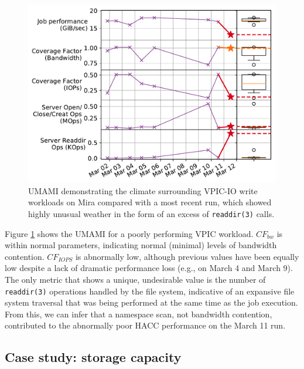 {\begin{figure}[t]
    \centering
    \includegraphics[width=1.0\columnwidth]{figs/umami-mira-fs1-vpic-write.pdf}
    \vspace{-.25in}
    \caption{UMAMI demonstrating the climate surrounding VPIC-IO write workloads on Mira compared with a most recent run, which showed highly unusual weather in the form of an excess of \texttt{readdir(3)} calls.
    }
    \label{fig:umami-mira-fs1-vpic-write}
	\vspace{-.15in}
\end{figure}

Figure \ref{fig:umami-mira-fs1-vpic-write} shows the UMAMI for a poorly performing VPIC workload.
$\mathit{CF}_{\mathit{bw}}$ is within normal parameters, indicating normal (minimal) levels of bandwidth contention.
$\mathit{CF}_{\mathit{IOPS}}$ is abnormally low, although previous values have been equally low despite a lack of dramatic performance loss (e.g., on March 4 and March 9).
The only metric that shows a unique, undesirable value is the number of \texttt{readdir(3)} operations handled by the file system, indicative of an expansive file system traversal that was being performed at the same time as the job execution.   From this, we can infer that a namespace scan, not bandwidth contention, contributed to the abnormally poor HACC performance on the March 11 run.

\subsection{Case study: storage capacity}

}
